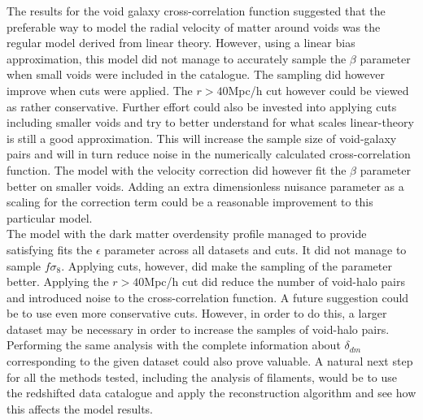The results for the void galaxy cross-correlation function suggested that the preferable way to model the radial velocity of matter around voids was the regular model derived from linear theory. However, using a linear bias approximation, this model did not manage to accurately sample the $\beta$ parameter when small voids were included in the catalogue. The sampling did however improve when cuts were applied. The $r>40$Mpc/h cut however could be viewed as rather conservative. Further effort could also be invested into applying cuts including smaller voids and try to better understand for what scales linear-theory is still a good approximation. This will increase the sample size of void-galaxy pairs and will in turn reduce noise in the numerically calculated cross-correlation function. The model with the velocity correction did however fit the $\beta$ parameter better on smaller voids. Adding an extra dimensionless nuisance parameter as a scaling for the correction term could be a reasonable improvement to this particular model.\\\indent
The model with the dark matter overdensity profile managed to provide satisfying fits the $\epsilon$ parameter across all datasets and cuts. It did not manage to sample $f\sigma_8$. Applying cuts, however, did make the sampling of the parameter better. Applying the $r>40$Mpc/h cut did reduce the number of void-halo pairs and introduced noise to the cross-correlation function. A future suggestion could be to use even more conservative cuts. However, in order to do this, a larger dataset may be necessary in order to increase the samples of void-halo pairs. Performing the same analysis with the complete information about $\delta_{dm}$ corresponding to the given dataset could also prove valuable. A natural next step for all the methods tested, including the analysis of filaments, would be to use the redshifted data catalogue and apply the reconstruction algorithm and see how this affects the model results.